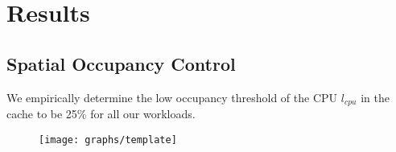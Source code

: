 \section{Results} \label{results}
\subsection{Spatial Occupancy Control}
We empirically determine the low occupancy threshold of the CPU \textit{$l_{cpu}$} in the cache to be 25\% for all our workloads.
\begin{figure}[htbp]
   \texttt{[image: graphs/template]}
   \label{fig:template}
\end{figure}
